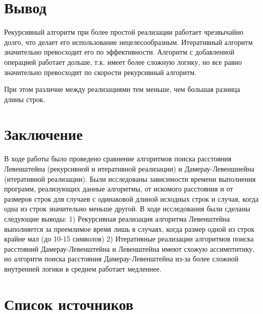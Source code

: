 \documentclass[a4paper, 14pt]{article}
\begin{document}
	
	\newpage
	\section{Вывод}
	Рекурсивный алгоритм при более простой реализации работает чрезвычайно долго, что делает его использование нецелесообразным. Итеративный алгоритм значительно превосходит его по эффективности.
	Алгоритм с добавленной операцией работает дольше, т.к. имеет более сложную логику, но все равно значительно превосходит по скорости рекурсивный алгоритм.
	
	При этом различие между реализациями тем меньше, чем большая разница длины строк.
	
	\newpage
	\section{Заключение}
	
	В ходе работы было проведено сравнение алгоритмов поиска расстояния Левенштейна (рекурсивной и итеративной реализации) и Дамерау-Левеншнейна (итеративной реализации). Были исследованы зависимости времени выполнения программ, реализующих данные алгоритмы, от искомого расстояния и от размеров строк для случаев с одинаковой длиной исходных строк и случая, когда одна из строк значительно меньше другой. В ходе исследования были сделаны следующие выводы:
	1) Рекурсивная реализация алгоритма Левенштейна выполняется за преемлимое время лишь в случаях, когда размер одной из строк крайне мал (до 10-15 символов)
	2) Итеративные реализации алгоритмов поиска расстояний Дамерау-Левенштейна и Левенштейна имеют схожую ассимптитику, но алгоритм поиска расстояния Дамерау-Левенштейна из-за более сложной внутренней логики в среднем работает медленнее.
	
	\newpage
	\section{Список источников}
	

	
	
\end{document}
